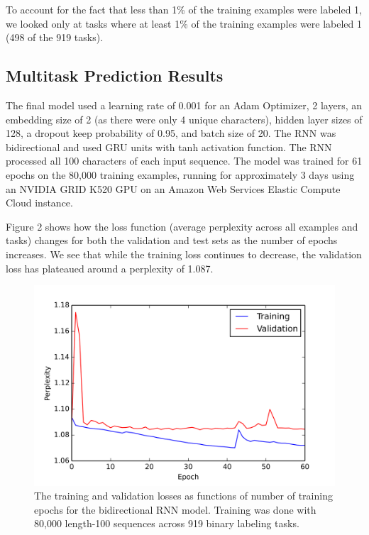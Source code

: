 \documentclass{article} %
\begin{document}
To account for the fact that less than 1\% of the training examples were labeled 1, we looked only at tasks where at least 1\% of the training examples were labeled 1 (498 of the 919 tasks).

\subsection{Multitask Prediction Results}

The final model used a learning rate of 0.001 for an Adam Optimizer, 2 layers, an embedding size of 2 (as there were only 4 unique characters), hidden layer sizes of 128, a dropout keep probability of 0.95, and batch size of 20. The RNN was bidirectional and used GRU units with tanh activation function. The RNN processed all 100 characters of each input sequence. The model was trained for 61 epochs on the 80,000 training examples, running for approximately 3 days using an NVIDIA GRID K520 GPU on an Amazon Web Services Elastic Compute Cloud instance.

Figure 2 shows how the loss function (average perplexity across all examples and tasks) changes for both the validation and test sets as the number of epochs increases. We see that while the training loss continues to decrease, the validation loss has plateaued around a perplexity of 1.087.

\begin{figure}[!htb]
	\centering
	\includegraphics[scale=0.6]{loss_100}
	\caption{The training and validation losses as functions of number of training epochs for the bidirectional RNN model. Training was done with 80,000 length-100 sequences across 919 binary labeling tasks.}
\end{figure}
\end{document}
